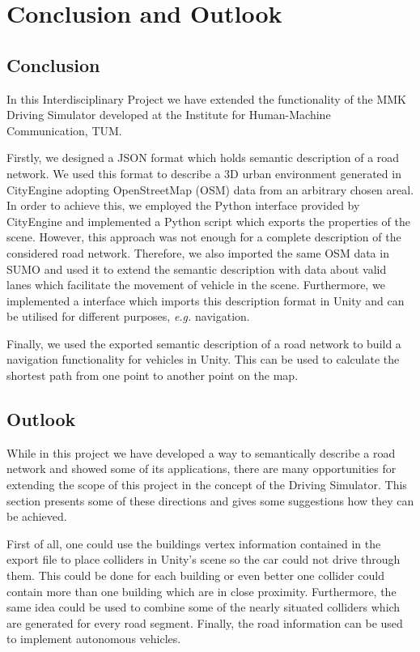 \chapter{Conclusion and Outlook}
\label{ch:conclusion}

\section{Conclusion}
In this Interdisciplinary Project we have extended the functionality of the MMK Driving Simulator developed at the Institute for Human-Machine Communication, TUM.

Firstly, we designed a JSON format which holds semantic description of a road network. We used this format to describe a 3D urban environment generated in CityEngine adopting OpenStreetMap (OSM) data from an arbitrary chosen areal. In order to achieve this, we employed the Python interface provided by CityEngine and implemented a Python script which exports the properties of the scene. However, this approach was not enough for a complete description of the considered road network. Therefore, we also imported the same OSM data in SUMO and used it to extend the semantic description with data about valid lanes which facilitate the movement of vehicle in the scene. Furthermore, we implemented a interface which imports this description format in Unity and can be utilised for different purposes, \emph{e.g.} navigation. 

Finally, we used the exported semantic description of a road network to  build a navigation functionality for vehicles in Unity. This can be used to calculate the shortest path from one point to another point on the map.

\section{Outlook}

While in this project we have developed a way to semantically describe a road network and showed some of its applications, there are many opportunities for extending the scope of this project in the concept of the Driving Simulator. This section presents some of these directions and gives some suggestions how they can be achieved. 

First of all, one could use the buildings vertex information contained in the export file to place colliders in Unity's scene so the car could not drive through them. This could be done for each building or even better one collider could contain more than one building which are in close proximity. Furthermore, the same idea could be used to combine some of the nearly situated colliders which are generated for every road segment. Finally, the road information can be used to implement autonomous vehicles. 

